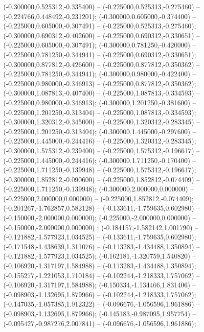  (-0.300000,0.525312,-0.335400) -- (-0.225000,0.525313,-0.275460) -- (-0.224766,0.448492,-0.231201);
 (-0.300000,0.605000,-0.374400) -- (-0.225000,0.605000,-0.307491) -- (-0.225000,0.525313,-0.275460);
 (-0.300000,0.690312,-0.402600) -- (-0.225000,0.690312,-0.330651) -- (-0.225000,0.605000,-0.307491);
 (-0.300000,0.781250,-0.420000) -- (-0.225000,0.781250,-0.344941) -- (-0.225000,0.690312,-0.330651);
 (-0.300000,0.877812,-0.426600) -- (-0.225000,0.877812,-0.350362) -- (-0.225000,0.781250,-0.344941);
 (-0.300000,0.980000,-0.422400) -- (-0.225000,0.980000,-0.346913) -- (-0.225000,0.877812,-0.350362);
 (-0.300000,1.087813,-0.407400) -- (-0.225000,1.087813,-0.334593) -- (-0.225000,0.980000,-0.346913);
 (-0.300000,1.201250,-0.381600) -- (-0.225000,1.201250,-0.313404) -- (-0.225000,1.087813,-0.334593);
 (-0.300000,1.320312,-0.345000) -- (-0.225000,1.320312,-0.283345) -- (-0.225000,1.201250,-0.313404);
 (-0.300000,1.445000,-0.297600) -- (-0.225000,1.445000,-0.244416) -- (-0.225000,1.320312,-0.283345);
 (-0.300000,1.575312,-0.239400) -- (-0.225000,1.575312,-0.196617) -- (-0.225000,1.445000,-0.244416);
 (-0.300000,1.711250,-0.170400) -- (-0.225000,1.711250,-0.139948) -- (-0.225000,1.575312,-0.196617);
 (-0.300000,1.852812,-0.090600) -- (-0.225000,1.852812,-0.074409) -- (-0.225000,1.711250,-0.139948);
 (-0.300000,2.000000,0.000000) -- (-0.225000,2.000000,0.000000) -- (-0.225000,1.852812,-0.074409);
 (-0.201267,-1.762857,0.582128) -- (-0.133611,-1.759635,0.602980) -- (-0.150000,-2.000000,0.000000);
 (-0.225000,-2.000000,0.000000) -- (-0.150000,-2.000000,0.000000) ;
 (-0.184157,-1.582142,1.001790) -- (-0.121882,-1.577923,1.034525) -- (-0.133611,-1.759635,0.602980);
 (-0.171548,-1.438639,1.311076) -- (-0.113283,-1.434488,1.350894) -- (-0.121882,-1.577923,1.034525);
 (-0.162181,-1.320759,1.540820) -- (-0.106920,-1.317197,1.584988) -- (-0.113283,-1.434488,1.350894);
 (-0.155277,-1.221053,1.710184) -- (-0.102244,-1.218333,1.757062) -- (-0.106920,-1.317197,1.584988);
 (-0.150334,-1.134466,1.831406) -- (-0.098903,-1.132695,1.879966) -- (-0.102244,-1.218333,1.757062);
 (-0.147035,-1.057385,1.912322) -- (-0.096676,-1.056596,1.961886) -- (-0.098903,-1.132695,1.879966);
 (-0.145183,-0.987095,1.957754) -- (-0.095427,-0.987276,2.007841) -- (-0.096676,-1.056596,1.961886);
